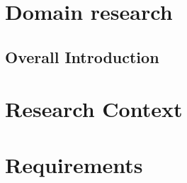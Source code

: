 \chapter{Domain research}
\section{Overall Introduction}



\chapter{Research Context}


\chapter{Requirements}
